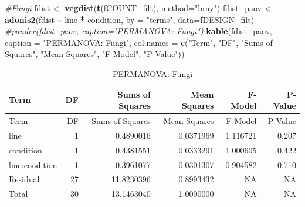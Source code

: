 \documentclass[
  11pt,
]{article}
\newenvironment{Shaded}{\begin{snugshade}}{\end{snugshade}}
\newcommand{\AttributeTok}[1]{\textcolor[rgb]{0.13,0.29,0.53}{#1}}
\newcommand{\CommentTok}[1]{\textcolor[rgb]{0.56,0.35,0.01}{\textit{#1}}}
\newcommand{\FunctionTok}[1]{\textcolor[rgb]{0.13,0.29,0.53}{\textbf{#1}}}
\newcommand{\NormalTok}[1]{#1}
\newcommand{\OtherTok}[1]{\textcolor[rgb]{0.56,0.35,0.01}{#1}}
\newcommand{\SpecialCharTok}[1]{\textcolor[rgb]{0.81,0.36,0.00}{\textbf{#1}}}
\newcommand{\StringTok}[1]{\textcolor[rgb]{0.31,0.60,0.02}{#1}}
\begin{document}
\begin{Shaded}
\begin{Highlighting}[]
\CommentTok{\#Fungi}
\NormalTok{fdist }\OtherTok{\textless{}{-}} \FunctionTok{vegdist}\NormalTok{(}\FunctionTok{t}\NormalTok{(fCOUNT\_filt), }\AttributeTok{method=}\StringTok{"bray"}\NormalTok{)}
\NormalTok{fdist\_paov }\OtherTok{\textless{}{-}} \FunctionTok{adonis2}\NormalTok{(fdist }\SpecialCharTok{\textasciitilde{}}\NormalTok{ line }\SpecialCharTok{*}\NormalTok{ condition, }\AttributeTok{by =} \StringTok{"terms"}\NormalTok{, }\AttributeTok{data=}\NormalTok{fDESIGN\_filt)}
\CommentTok{\#pander(fdist\_paov, caption="PERMANOVA: Fungi")}
\FunctionTok{kable}\NormalTok{(fdist\_paov, }\AttributeTok{caption =} \StringTok{"PERMANOVA: Fungi"}\NormalTok{,}
      \AttributeTok{col.names =} \FunctionTok{c}\NormalTok{(}\StringTok{"Term"}\NormalTok{, }\StringTok{"DF"}\NormalTok{, }\StringTok{"Sums of Squares"}\NormalTok{, }\StringTok{"Mean Squares"}\NormalTok{, }\StringTok{"F{-}Model"}\NormalTok{, }\StringTok{"P{-}Value"}\NormalTok{))}
\end{Highlighting}
\end{Shaded}

\begin{longtable}[]{@{}lrrrrr@{}}
\caption{PERMANOVA: Fungi}\tabularnewline
\toprule\noalign{}
Term & DF & Sums of Squares & Mean Squares & F-Model & P-Value \\
\midrule\noalign{}
\endfirsthead
\toprule\noalign{}
Term & DF & Sums of Squares & Mean Squares & F-Model & P-Value \\
\midrule\noalign{}
\endhead
\bottomrule\noalign{}
\endlastfoot
line & 1 & 0.4890016 & 0.0371969 & 1.116721 & 0.207 \\
condition & 1 & 0.4381551 & 0.0333291 & 1.000605 & 0.422 \\
line:condition & 1 & 0.3961077 & 0.0301307 & 0.904582 & 0.710 \\
Residual & 27 & 11.8230396 & 0.8993432 & NA & NA \\
Total & 30 & 13.1463040 & 1.0000000 & NA & NA \\
\end{longtable}
\end{document}
